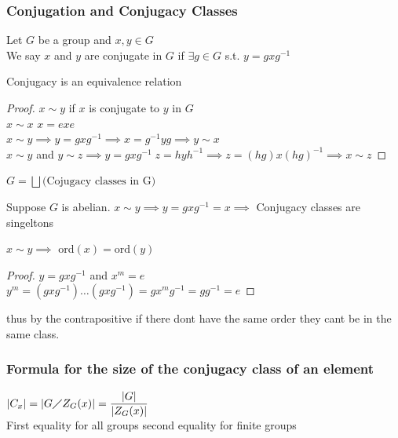 \subsubsection{Conjugation and Conjugacy Classes}
\begin{definition}
    Let $G$ be a group and $x,y \in  G$\\
    We say $x$ and $y$ are conjugate in $G$ if $\exists g \in G$ s.t. $y=gxg^{-1}$
\end{definition}
\begin{proposition}
    Conjugacy is an equivalence relation
\end{proposition}
\begin{proof}
    $x \sim y$ if $x$ is conjugate to $y$ in $G$\\
    $x \sim x$  $x=exe$\\
    $x \sim y \implies y=gxg^{-1} \implies x=g^{-1}yg \implies y  \sim x$\\
    $x  \sim y$ and $y \sim z \implies y=gxg^{-1}\; z=hyh^{-1}\implies z=(hg)x(hg)^{-1} \implies x \sim z$
\end{proof}

$G = \bigsqcup \text{(Cojugacy classes in G)}$

\begin{example}
    Suppose $G$ is abelian. $x\sim y \implies y=gxg^{-1}=x \implies$ Conjugacy classes are singeltons 
\end{example}
$x \sim y \implies $ ord$(x)=\text{ord}(y)$\\
\begin{proof}
    $y=gxg^{-1}$ and $x^m = e$\\
    $y^m=(gxg^{-1})\dots(gxg^{-1})=gx^mg^{-1}=gg^{-1}=e$
\end{proof}
thus by the contrapositive if there dont have the same order they cant be in the same class.\\
\subsubsection*{Formula for the size of the conjugacy class of an element}
\begin{theorem}
    $|C_x|=|G\diagup Z_G(x)|=\dfrac{|G|}{|Z_G(x)|}$\\
    First equality for all groups second equality for finite groups
\end{theorem}